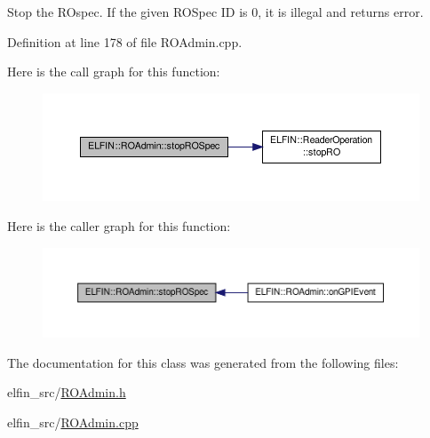 Stop the R\-Ospec. If the given R\-O\-Spec I\-D is 0, it is illegal and returns error. 



Definition at line 178 of file R\-O\-Admin.\-cpp.



Here is the call graph for this function\-:
\nopagebreak
\begin{figure}[H]
\begin{center}
\leavevmode
\includegraphics[width=350pt]{class_e_l_f_i_n_1_1_r_o_admin_ab998bfdbdd0564ca0aaf044781f58456_cgraph}
\end{center}
\end{figure}




Here is the caller graph for this function\-:
\nopagebreak
\begin{figure}[H]
\begin{center}
\leavevmode
\includegraphics[width=350pt]{class_e_l_f_i_n_1_1_r_o_admin_ab998bfdbdd0564ca0aaf044781f58456_icgraph}
\end{center}
\end{figure}




The documentation for this class was generated from the following files\-:\begin{DoxyCompactItemize}
\item 
elfin\-\_\-src/\hyperlink{_r_o_admin_8h}{R\-O\-Admin.\-h}\item 
elfin\-\_\-src/\hyperlink{_r_o_admin_8cpp}{R\-O\-Admin.\-cpp}\end{DoxyCompactItemize}
